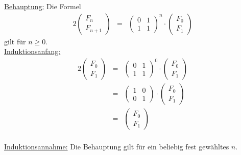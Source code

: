 \documentclass[10pt,a4paper,oneside,ngerman,numbers=noenddot]{scrartcl}
\begin{document}
\section{} %
	\subsection{} %
		\underline{Behauptung:} Die Formel
		\begin{alignat*}{2}
			\begin{pmatrix}
		 		F_{n} \\
		 		F_{n+1}
			\end{pmatrix} &=& \begin{pmatrix}
		 		0 & 1 \\
			 	1 & 1
			\end{pmatrix}^{n} \cdot \begin{pmatrix}
			 	F_{0} \\
				F_{1}
			\end{pmatrix} 	
		\end{alignat*}
		gilt für $n \geq 0$.\\
		\underline{Induktionsanfang:}\\
		\begin{alignat*}{2}
			\begin{pmatrix}
				F_{0} \\
				F_{1}
			\end{pmatrix} &=& \begin{pmatrix}
				0 & 1 \\
			 	1 & 1
			\end{pmatrix}^{0} \cdot \begin{pmatrix}
			 	F_{0} \\
				F_{1}
			\end{pmatrix} \\
			&=& \begin{pmatrix}
				1 & 0 \\
			 	0 & 1
			\end{pmatrix} \cdot \begin{pmatrix}
			 	F_{0} \\
				F_{1}
			\end{pmatrix} \\
			&=& \begin{pmatrix}
			 	F_{0} \\
				F_{1}
			\end{pmatrix}
		\end{alignat*}\\
		\underline{Induktionsannahme:} Die Behauptung gilt für ein beliebig fest gewähltes $n$.\\
\end{document}

